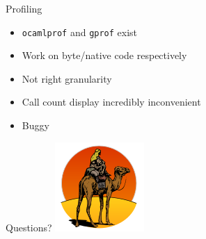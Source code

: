 \documentclass{beamer}
\begin{document}
\begin{frame}{Profiling}
  \begin{itemize}
    \item \texttt{ocamlprof} and \texttt{gprof} exist
    \item Work on byte/native code respectively
    \item Not right granularity
    \item Call count display incredibly inconvenient
    \item Buggy
  \end{itemize}
\end{frame}


\begin{frame}{Questions?}
  \centering
  \includegraphics[height=.85\textheight]{camel}
\end{frame}
\end{document}
